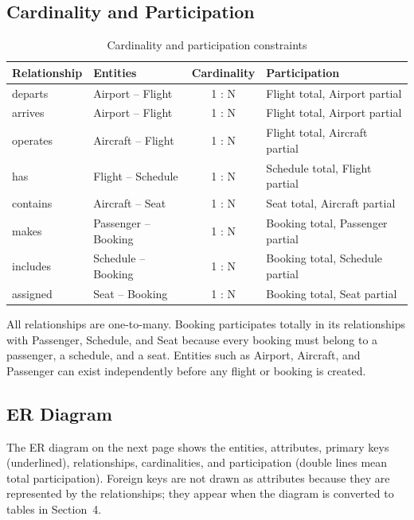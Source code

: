 \documentclass[12pt,a4paper]{article}
\begin{document}
\subsection{Cardinality and Participation}
\begin{table}[H]
\centering\small
\begin{tabularx}{\textwidth}{l l c X}
\toprule
\textbf{Relationship} & \textbf{Entities} & \textbf{Cardinality} & \textbf{Participation}\\
\midrule
departs  & Airport -- Flight   & 1 : N & Flight total, Airport partial\\
arrives  & Airport -- Flight   & 1 : N & Flight total, Airport partial\\
operates & Aircraft -- Flight  & 1 : N & Flight total, Aircraft partial\\
has      & Flight -- Schedule  & 1 : N & Schedule total, Flight partial\\
contains & Aircraft -- Seat   & 1 : N & Seat total, Aircraft partial\\
makes    & Passenger -- Booking & 1 : N & Booking total, Passenger partial\\
includes & Schedule -- Booking & 1 : N & Booking total, Schedule partial\\
assigned & Seat -- Booking     & 1 : N & Booking total, Seat partial\\
\bottomrule
\end{tabularx}
\caption{Cardinality and participation constraints}
\end{table}
All relationships are one-to-many. Booking participates totally in its relationships with Passenger,
Schedule, and Seat because every booking must belong to a passenger, a schedule, and a seat. Entities such
as Airport, Aircraft, and Passenger can exist independently before any flight or booking is created.

\subsection{ER Diagram}
The ER diagram on the next page shows the entities, attributes, primary keys (underlined), relationships,
cardinalities, and participation (double lines mean total participation). Foreign keys are not drawn as
attributes because they are represented by the relationships; they appear when the diagram is converted to
tables in Section~4.
\end{document}
